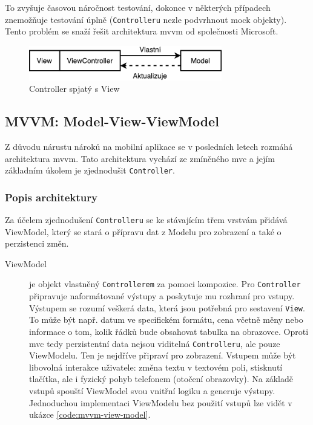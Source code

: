 To zvyšuje časovou náročnost testování, dokonce v některých případech znemožňuje testování úplně (\texttt{Controlleru} nezle podvrhnout mock objekty).
Tento problém se snaží řešit architektura \acrfull{mvvm} od společnosti Microsoft.

\begin{figure}\centering
	\includegraphics[width=0.75\textwidth]{assets/analysis-massive-view-controller.pdf}
	\caption[Role Controlleru v MVC]{Controller spjatý s View}\label{fig:massive-mvc}
\end{figure}

\subsection{MVVM: Model-View-ViewModel}\label{analyza-mvvm}

Z důvodu nárustu nároků na mobilní aplikace se v posledních letech rozmáhá architektura \acrshort{mvvm}.
Tato architektura vychází ze zmíněného \acrshort{mvc} a jejím základním úkolem je zjednodušit \texttt{Controller}.

\subsubsection*{Popis architektury} \label{architektura-mvvm-popis}

Za účelem zjednodušení \texttt{Controlleru} se ke stávajícím třem vrstvám přidává ViewModel, který se stará o přípravu dat z Modelu pro zobrazení a také o perzistenci změn.

\begin{description}
  \item[ViewModel] je objekt vlastněný \texttt{Controllerem} za pomoci kompozice.
  Pro \texttt{Controller} připravuje naformátované výstupy a poskytuje mu rozhraní pro vstupy.
  Výstupem se rozumí veškerá data, která jsou potřebná pro sestavení \texttt{View}.
  To může být např. datum ve specifickém formátu, cena včetně měny nebo informace o tom, kolik řádků bude obsahovat tabulka na obrazovce.
  Oproti \acrshort{mvc} tedy perzistentní data nejsou viditelná \texttt{Controlleru}, ale pouze ViewModelu.
  Ten je nejdříve připraví pro zobrazení.
  Vstupem může být libovolná interakce uživatele:
  změna textu v textovém poli, stisknutí tlačítka, ale i fyzický pohyb telefonem (otočení obrazovky).
  Na základě vstupů spouští ViewModel svou vnitřní logiku a generuje výstupy.
  Jednoduchou implementaci ViewModelu bez použití vstupů lze vidět v ukázce \ref{code:mvvm-view-model}.
\end{description}

